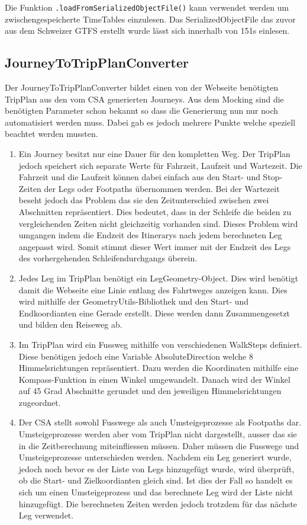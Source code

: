 Die Funktion \texttt{.loadFromSerializedObjectFile()} kann verwendet werden um zwischengespeicherte TimeTables einzulesen. Das SerializedObjectFile das zuvor aus dem Schweizer GTFS erstellt wurde lässt sich innerhalb von 151s einlesen.


\subsection{JourneyToTripPlanConverter}
Der JourneyToTripPlanConverter bildet einen von der Webseite benötigten TripPlan aus den vom CSA generierten Journeys. Aus dem Mocking sind die benötigten Parameter schon bekannt so dass die Generierung nun nur noch automatisiert werden muss. Dabei gab es jedoch mehrere Punkte welche speziell beachtet werden mussten.
\begin{enumerate}
	\item Ein Journey besitzt nur eine Dauer für den kompletten Weg. Der TripPlan jedoch speichert sich separate Werte für Fahrzeit, Laufzeit und Wartezeit. Die Fahrzeit und die Laufzeit können dabei einfach aus den Start- und Stop-Zeiten der Legs oder Footpaths übernommen werden. Bei der Wartezeit beseht jedoch das Problem das sie den Zeitunterschied zwischen zwei Abschnitten repräsentiert. Dies bedeutet, dass in der Schleife die beiden zu vergleichenden Zeiten nicht gleichzeitig vorhanden sind. Dieses Problem wird umgangen indem die Endzeit des Itinerarys nach jedem berechneten Leg angepasst wird. Somit stimmt dieser Wert immer mit der Endzeit des Legs des vorhergehenden Schleifendurchgangs überein. 
	\item Jedes Leg im TripPlan benötigt ein LegGeometry-Object. Dies wird benötigt damit die Webseite eine Linie entlang des Fahrtweges anzeigen kann. Dies wird mithilfe der GeometryUtils-Bibliothek und den Start- und Endkoordianten eine Gerade erstellt. Diese werden dann Zusammengesetzt und bilden den Reiseweg ab.
	\item Im TripPlan wird ein Fussweg mithilfe von verschiedenen WalkSteps definiert. Diese benötigen jedoch eine Variable AbsoluteDirection welche 8 Himmelsrichtungen repräsentiert. Dazu werden die Koordinaten mithilfe eine Kompass-Funktion in einen Winkel umgewandelt. Danach wird der Winkel auf 45 Grad Abschnitte gerundet und den jeweiligen Himmelsrichtungen zugeordnet.
	\item Der CSA stellt sowohl Fusswege als auch Umsteigeprozesse als Footpaths dar. Umsteigeprozesse werden aber vom TripPlan nicht dargestellt, ausser das sie in die Zeitberechnung miteinfliessen müssen. Daher müssen die Fusswege und Umsteigeprozesse unterschieden werden. Nachdem ein Leg generiert wurde, jedoch noch bevor es der Liste von Legs hinzugefügt wurde, wird überprüft, ob die Start- und Zielkoordianten gleich sind. Ist dies der Fall so handelt es sich um einen Umsteigeprozess und das berechnete Leg wird der Liste nicht hinzugefügt. Die berechneten Zeiten werden jedoch trotzdem für das nächste Leg verwendet.
\end{enumerate}

